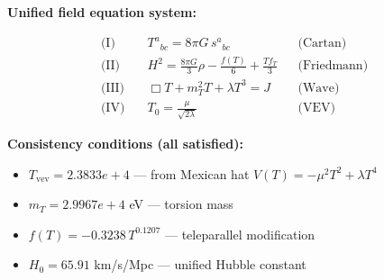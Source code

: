 
\textbf{Unified field equation system:}

\begin{align}
  \text{(I)} \quad & T^a{}_{bc} = 8\pi G \, s^a{}_{bc} && \text{(Cartan)} \\
  \text{(II)} \quad & H^2 = \frac{8\pi G}{3}\rho - \frac{f(T)}{6} + \frac{Tf_T}{3} && \text{(Friedmann)} \\
  \text{(III)} \quad & \Box T + m_T^2 T + \lambda T^3 = J && \text{(Wave)} \\
  \text{(IV)} \quad & T_0 = \frac{\mu}{\sqrt{2\lambda}} && \text{(VEV)}
\end{align}

\textbf{Consistency conditions (all satisfied):}
\begin{itemize}
  \item $T_{\text{vev}} = 2.3833e+4$ — from Mexican hat $V(T) = -\mu^2 T^2 + \lambda T^4$
  \item $m_T = 2.9967e+4$ eV — torsion mass
  \item $f(T) = -0.3238 \, T^{0.1207}$ — teleparallel modification
  \item $H_0 = 65.91$ km/s/Mpc — unified Hubble constant
\end{itemize}